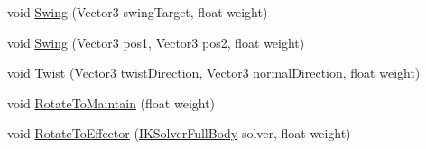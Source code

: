 \begin{DoxyCompactItemize}
\item 
void \mbox{\hyperlink{class_root_motion_1_1_final_i_k_1_1_i_k_mapping_1_1_bone_map_a2db90ad6f5ab152b35b185035ff0ae40}{Swing}} (Vector3 swing\+Target, float weight)
\item 
void \mbox{\hyperlink{class_root_motion_1_1_final_i_k_1_1_i_k_mapping_1_1_bone_map_a6ed19e650318ee98b939fff8b2afd7a9}{Swing}} (Vector3 pos1, Vector3 pos2, float weight)
\item 
void \mbox{\hyperlink{class_root_motion_1_1_final_i_k_1_1_i_k_mapping_1_1_bone_map_a04c0ce51a6d69d27d6a54c243ed9a1bc}{Twist}} (Vector3 twist\+Direction, Vector3 normal\+Direction, float weight)
\item 
void \mbox{\hyperlink{class_root_motion_1_1_final_i_k_1_1_i_k_mapping_1_1_bone_map_adf04301550ad39e3e949611c44525607}{Rotate\+To\+Maintain}} (float weight)
\item 
void \mbox{\hyperlink{class_root_motion_1_1_final_i_k_1_1_i_k_mapping_1_1_bone_map_a89adeed484871676266ab724b22fc6de}{Rotate\+To\+Effector}} (\mbox{\hyperlink{class_root_motion_1_1_final_i_k_1_1_i_k_solver_full_body}{I\+K\+Solver\+Full\+Body}} solver, float weight)
\end{DoxyCompactItemize}
